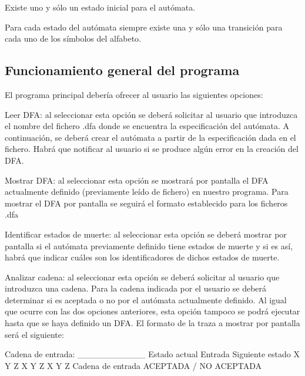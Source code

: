 \begin{DoxyItemize}
\item Existe uno y sólo un estado inicial para el autómata.
\item Para cada estado del autómata siempre existe una y sólo una transición para cada uno de los símbolos del alfabeto.
\end{DoxyItemize}

\subsection*{Funcionamiento general del programa}

El programa principal debería ofrecer al usuario las siguientes opciones\+:


\begin{DoxyItemize}
\item Leer D\+FA\+: al seleccionar esta opción se deberá solicitar al usuario que introduzca el nombre del fichero .dfa donde se encuentra la especificación del autómata. A continuación, se deberá crear el autómata a partir de la especificación dada en el fichero. Habrá que notificar al usuario si se produce algún error en la creación del D\+FA.
\item Mostrar D\+FA\+: al seleccionar esta opción se mostrará por pantalla el D\+FA actualmente definido (previamente leído de fichero) en nuestro programa. Para mostrar el D\+FA por pantalla se seguirá el formato establecido para los ficheros .dfa
\item Identificar estados de muerte\+: al seleccionar esta opción se deberá mostrar por pantalla si el autómata previamente definido tiene estados de muerte y si es así, habrá que indicar cuáles son los identificadores de dichos estados de muerte.
\item Analizar cadena\+: al seleccionar esta opción se deberá solicitar al usuario que introduzca una cadena. Para la cadena indicada por el usuario se deberá determinar si es aceptada o no por el autómata actualmente definido. Al igual que ocurre con las dos opciones anteriores, esta opción tampoco se podrá ejecutar hasta que se haya definido un D\+FA. El formato de la traza a mostrar por pantalla será el siguiente\+: \begin{DoxyVerb}      Cadena de entrada: ___________
      Estado actual    Entrada    Siguiente estado
      X                Y          Z
      X                Y          Z
      X                Y          Z
      Cadena de entrada ACEPTADA / NO ACEPTADA
\end{DoxyVerb}

\end{DoxyItemize}

